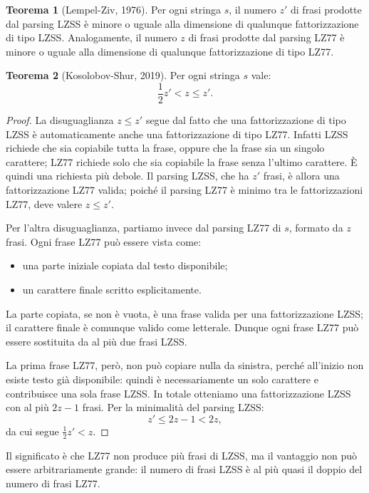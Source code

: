 \documentclass{article}
\theoremstyle{definition}
\newtheorem{theorem}{Teorema}[section] %
\numberwithin{equation}{section}
\begin{document}
\begin{theorem}[Lempel-Ziv, 1976]
    Per ogni stringa $s$, il numero $z'$ di frasi prodotte dal parsing LZSS è minore o uguale alla dimensione di qualunque fattorizzazione di tipo LZSS. Analogamente, il numero $z$ di frasi prodotte dal parsing LZ77 è minore o uguale alla dimensione di qualunque fattorizzazione di tipo LZ77.
\end{theorem}

\begin{theorem}[Kosolobov-Shur, 2019]
    Per ogni stringa $s$ vale:
    \[
        \frac{1}{2}z' < z \leq z'.
    \]
\end{theorem}
\begin{proof}
    La disuguaglianza $z\leq z'$ segue dal fatto che una fattorizzazione di tipo LZSS è automaticamente anche una fattorizzazione di tipo LZ77. Infatti LZSS richiede che sia copiabile tutta la frase, oppure che la frase sia un singolo carattere; LZ77 richiede solo che sia copiabile la frase senza l'ultimo carattere. È quindi una richiesta più debole. Il parsing LZSS, che ha $z'$ frasi, è allora una fattorizzazione LZ77 valida; poiché il parsing LZ77 è minimo tra le fattorizzazioni LZ77, deve valere $z\leq z'$.

    Per l'altra disuguaglianza, partiamo invece dal parsing LZ77 di $s$, formato da $z$ frasi. Ogni frase LZ77 può essere vista come:
    \begin{itemize}
        \item una parte iniziale copiata dal testo disponibile;
        \item un carattere finale scritto esplicitamente.
    \end{itemize}
    La parte copiata, se non è vuota, è una frase valida per una fattorizzazione LZSS; il carattere finale è comunque valido come letterale. Dunque ogni frase LZ77 può essere sostituita da al più due frasi LZSS.

    La prima frase LZ77, però, non può copiare nulla da sinistra, perché all'inizio non esiste testo già disponibile: quindi è necessariamente un solo carattere e contribuisce una sola frase LZSS. In totale otteniamo una fattorizzazione LZSS con al più $2z-1$ frasi. Per la minimalità del parsing LZSS:
    \[
        z' \leq 2z-1 < 2z,
    \]
    da cui segue $\frac{1}{2}z' < z$.
\end{proof}

Il significato è che LZ77 non produce più frasi di LZSS, ma il vantaggio non può essere arbitrariamente grande: il numero di frasi LZSS è al più quasi il doppio del numero di frasi LZ77.
\end{document}
